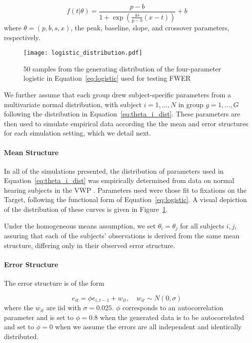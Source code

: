 \begin{equation}\label{eq:logistic}
f(t | \theta) = \frac{p-b}{1 + \exp \left(\frac{4s}{\text{p}-b} (x - t) \right)} + b
\end{equation}
where $\theta = (p, b, s, x)$, the peak, baseline, slope, and crossover parameters, respectively.


\begin{figure}
    \centering
\texttt{[image: logistic\_distribution.pdf]}
    \caption{50 samples from the generating distribution of the four-parameter logistic in Equation~\ref{eq:logistic} used for testing FWER}
\label{fig:distribution_log}
\end{figure}



We further assume that each group drew subject-specific parameters from a multivariate normal distribution, with subject $i = 1, \dots, N$ in group $g = 1, \dots, G$ following the distribution in Equation~\ref{eq:theta_i_dist}. These parameters are then used to simulate empirical data according the the mean and error structures for each simulation setting, which we detail next. 


\paragraph{Mean Structure} In all of the simulations presented, the distribution of parameters used in Equation~\ref{eq:theta_i_dist} was empirically determined from data on normal hearing subjects in the VWP \citep{FarrisTrimble2014}. Parameters used were those fit to fixations on the Target, following the functional form of Equation~\ref{eq:logistic}. A visual depiction of the distribution of these curves is given in Figure~\ref{fig:distribution_log}.

Under the homogeneous means assumption, we set $\theta_i = \theta_j$ for all subjects $i,j$, assuring that each of the subjects' observations is derived from the same mean structure, differing only in their observed error structure. 


\paragraph{Error Structure} The error structure is of the form

\begin{equation}
e_{it} = \phi e_{i, t-1} + w_{it}, \quad w_{it} \sim N(0, \sigma)
\end{equation}
where the $w_{it}$ are iid with $\sigma = 0.025$. $\phi$ corresponds to an autocorrelation parameter and is set to $\phi = 0.8$ when the generated data is to be autocorrelated and set to $\phi = 0$ when we assume the errors are all independent and identically distributed. 

